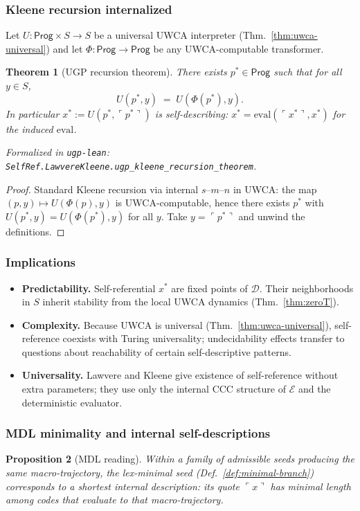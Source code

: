 \documentclass[12pt]{article}
\newtheorem{theorem}{Theorem}[section]
\newtheorem{proposition}[theorem]{Proposition}
\numberwithin{equation}{section}
\begin{document}
\subsubsection{Kleene recursion internalized}\label{subsec:kleene}
Let $U:\mathsf{Prog}\times S\to S$ be a universal UWCA interpreter (Thm.~\ref{thm:uwca-universal}) and let $\Phi:\mathsf{Prog}\to\mathsf{Prog}$ be any UWCA-computable transformer.

\begin{theorem}[UGP recursion theorem]\label{thm:ugp-recursion}
There exists $p^\ast\in \mathsf{Prog}$ such that for all $y\in S$,
\[
U(p^\ast,y)\;=\;U(\Phi(p^\ast),y).
\]
In particular $x^\ast:=U(p^\ast,\ulcorner p^\ast\urcorner)$ is self-describing: $x^\ast=\mathrm{eval}(\ulcorner x^\ast\urcorner,x^\ast)$ for the induced $\mathrm{eval}$.

\noindent\emph{Formalized in} \texttt{ugp-lean}: \texttt{SelfRef.LawvereKleene.ugp\_kleene\_recursion\_theorem}.
\end{theorem}
\begin{proof}
Standard Kleene recursion via internal $s$–$m$–$n$ in UWCA: the map $(p,y)\mapsto U(\Phi(p),y)$ is UWCA-computable, hence there exists $p^\ast$ with $U(p^\ast,y)=U(\Phi(p^\ast),y)$ for all $y$. Take $y=\ulcorner p^\ast\urcorner$ and unwind the definitions.
\end{proof}

\subsubsection{Implications}\label{subsec:selfref-implications}
\begin{itemize}[leftmargin=1.1em]
\item \textbf{Predictability.} Self-referential $x^\ast$ are fixed points of $\mathcal{D}$. Their neighborhoods in $S$ inherit stability from the local UWCA dynamics (Thm.~\ref{thm:zeroT}).
\item \textbf{Complexity.} Because UWCA is universal (Thm.~\ref{thm:uwca-universal}), self-reference coexists with Turing universality; undecidability effects transfer to questions about reachability of certain self-descriptive patterns.
\item \textbf{Universality.} Lawvere and Kleene give existence of self-reference without extra parameters; they use only the internal CCC structure of $\mathcal{E}$ and the deterministic evaluator.
\end{itemize}

\subsubsection{MDL minimality and internal self-descriptions}\label{subsec:selfref-mdl}
\begin{proposition}[MDL reading]\label{prop:selfref-mdl}
Within a family of admissible seeds producing the same macro-trajectory, the lex-minimal seed (Def.~\ref{def:minimal-branch}) corresponds to a shortest internal description: its quote $\ulcorner x\urcorner$ has minimal length among codes that evaluate to that macro-trajectory.
\end{proposition}
\end{document}
